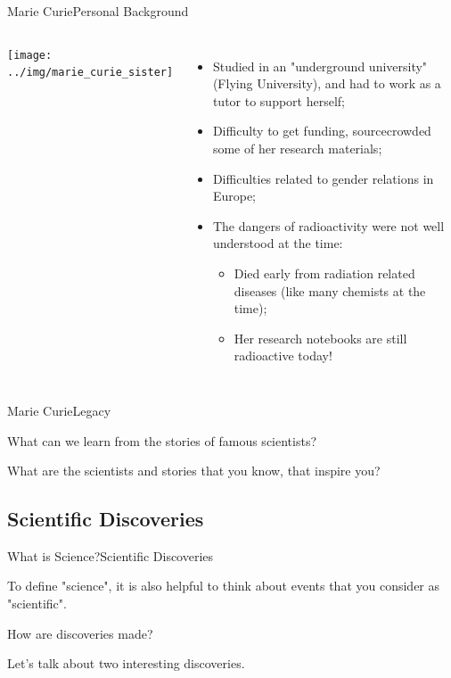 \begin{frame}{Marie Curie}{Personal Background}
  \begin{columns}
    \texttt{[image: ../img/marie\_curie\_sister]}
  \begin{itemize}
    \item Studied in an "underground university" (Flying University), and had to work as a tutor to support herself;\medskip
    
    \item Difficulty to get funding, sourcecrowded some of her research materials;\medskip
    
    \item Difficulties related to gender relations in Europe;\medskip

    \item The dangers of radioactivity were not well understood at the time: 
    \begin{itemize}
      \item Died early from radiation related diseases (like many chemists at the time);
      \item Her research notebooks are still radioactive today!
    \end{itemize}
  \end{itemize}
  \end{columns} 
\end{frame}

\begin{frame}{Marie Curie}{Legacy}

  What can we learn from the stories of famous scientists?\bigskip 

  What are the scientists and stories that you know, that inspire you?

\end{frame}

\subsection{Scientific Discoveries}


\begin{frame}[t]{What is Science?}{Scientific Discoveries}

  To define "science", it is also helpful to think about events that you consider as "scientific".\bigskip

  How are discoveries made?\bigskip

  Let's talk about two interesting discoveries.

\end{frame}

